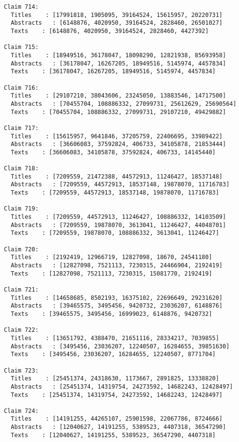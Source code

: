 \documentclass[11pt]{article}
\begin{document}
\begin{Verbatim}[commandchars=\\\{\}]
Claim 714:
  Titles    : [17991818, 1905095, 39164524, 15615957, 20220731]
  Abstracts   : [6148876, 4020950, 39164524, 2828460, 26501027]
  Texts    : [6148876, 4020950, 39164524, 2828460, 4427392]

Claim 715:
  Titles    : [18949516, 36178047, 18098290, 12821938, 85693958]
  Abstracts   : [36178047, 16267205, 18949516, 5145974, 4457834]
  Texts    : [36178047, 16267205, 18949516, 5145974, 4457834]

Claim 716:
  Titles    : [29107210, 38043606, 23245050, 13883546, 14717500]
  Abstracts   : [70455704, 108886332, 27099731, 25612629, 25690564]
  Texts    : [70455704, 108886332, 27099731, 29107210, 49429882]

Claim 717:
  Titles    : [15615957, 9641846, 37205759, 22406695, 33989422]
  Abstracts   : [36606083, 37592824, 406733, 34105878, 21853444]
  Texts    : [36606083, 34105878, 37592824, 406733, 14145440]

Claim 718:
  Titles    : [7209559, 21472388, 44572913, 11246427, 18537148]
  Abstracts   : [7209559, 44572913, 18537148, 19878070, 11716783]
  Texts    : [7209559, 44572913, 18537148, 19878070, 11716783]

Claim 719:
  Titles    : [7209559, 44572913, 11246427, 108886332, 14103509]
  Abstracts   : [7209559, 19878070, 3613041, 11246427, 44048701]
  Texts    : [7209559, 19878070, 108886332, 3613041, 11246427]

Claim 720:
  Titles    : [2192419, 12966719, 12827098, 18670, 24541180]
  Abstracts   : [12827098, 7521113, 7230315, 24466904, 2192419]
  Texts    : [12827098, 7521113, 7230315, 15081770, 2192419]

Claim 721:
  Titles    : [14658685, 8502193, 16375102, 22696649, 29231620]
  Abstracts   : [39465575, 3495456, 9420732, 23036207, 6148876]
  Texts    : [39465575, 3495456, 16999023, 6148876, 9420732]

Claim 722:
  Titles    : [13651792, 4388470, 21651116, 28334217, 7039855]
  Abstracts   : [3495456, 23036207, 12240507, 16284655, 39851630]
  Texts    : [3495456, 23036207, 16284655, 12240507, 8771704]

Claim 723:
  Titles    : [25451374, 24318630, 1173667, 2891825, 13338820]
  Abstracts   : [25451374, 14319754, 24273592, 14682243, 12428497]
  Texts    : [25451374, 14319754, 24273592, 14682243, 12428497]

Claim 724:
  Titles    : [14191255, 44265107, 25901598, 22067786, 8724666]
  Abstracts   : [12040627, 14191255, 5389523, 4407318, 36547290]
  Texts    : [12040627, 14191255, 5389523, 36547290, 4407318]


\end{Verbatim}
\end{document}
